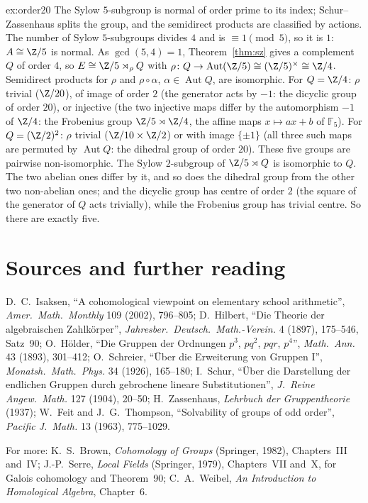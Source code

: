 \begin{solution}{ex:order20}
\idea The Sylow $5$-subgroup is normal of order prime to its index; Schur--Zassenhaus splits the group, and the semidirect products are classified by actions.
\writeup The number of Sylow $5$-subgroups divides $4$ and is $\equiv1\pmod5$, so it is $1$: $A\cong\Z/5$ is normal. As $\gcd(5,4)=1$, Theorem~\ref{thm:sz} gives a complement $Q$ of order $4$, so $E\cong\Z/5\rtimes_\rho Q$ with
$\rho\colon Q\to\operatorname{Aut}(\Z/5)\cong(\Z/5)^\times\cong\Z/4$. Semidirect products for $\rho$ and $\rho\circ\alpha$, $\alpha\in\operatorname{Aut}Q$, are isomorphic. For $Q=\Z/4$: $\rho$ trivial ($\Z/20$), of image of order $2$
(the generator acts by $-1$: the dicyclic group of order $20$), or injective (the two injective maps differ by the automorphism $-1$ of $\Z/4$: the Frobenius group $\Z/5\rtimes\Z/4$, the affine maps $x\mapsto ax+b$ of $\mathbb F_5$). For
$Q=(\Z/2)^2$: $\rho$ trivial ($\Z/10\times\Z/2$) or with image $\{\pm1\}$ (all three such maps are permuted by $\operatorname{Aut}Q$: the dihedral group of order $20$). These five groups are pairwise non-isomorphic. The Sylow $2$-subgroup of $\Z/5\rtimes Q$ is isomorphic to $Q$. The two abelian ones differ by it, and so does the dihedral group from the other two non-abelian ones; and the dicyclic group has
centre of order $2$ (the square of the generator of $Q$ acts trivially), while the Frobenius group has trivial centre. So there are exactly five.
\end{solution}

\section*{Sources and further reading}

D.~C.~Isaksen, ``A cohomological viewpoint on elementary school arithmetic'', \emph{Amer.\ Math.\ Monthly} 109 (2002), 796--805; D.~Hilbert, ``Die Theorie der algebraischen Zahlkörper'', \emph{Jahresber.\ Deutsch.\ Math.-Verein.} 4
(1897), 175--546, Satz~90; O.~Hölder, ``Die Gruppen der Ordnungen $p^3$, $pq^2$, $pqr$, $p^4$'', \emph{Math.\ Ann.} 43 (1893), 301--412; O.~Schreier, ``Über die Erweiterung von Gruppen I'', \emph{Monatsh.\ Math.\ Phys.} 34 (1926),
165--180; I.~Schur, ``Über die Darstellung der endlichen Gruppen durch gebrochene lineare Substitutionen'', \emph{J.\ Reine Angew.\ Math.} 127 (1904), 20--50; H.~Zassenhaus, \emph{Lehrbuch der Gruppentheorie} (1937); W.~Feit and
J.~G.~Thompson, ``Solvability of groups of odd order'', \emph{Pacific J.\ Math.} 13 (1963), 775--1029.

For more: K.~S.~Brown, \emph{Cohomology of Groups} (Springer, 1982), Chapters~III and~IV; J.-P.~Serre, \emph{Local Fields} (Springer, 1979), Chapters~VII and~X, for Galois cohomology and Theorem~90; C.~A.~Weibel,
\emph{An Introduction to Homological Algebra}, Chapter~6.

